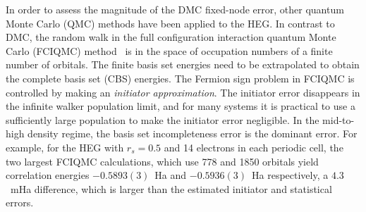 \documentclass[%
reprint,
 superscriptaddress,
 amsmath,amssymb,
 aps,
]{revtex4-1}
\begin{document}


In order to assess the magnitude of the DMC fixed-node error, other quantum Monte Carlo (QMC) methods
have been applied to the HEG.
In contrast to DMC, the random walk in the full configuration interaction quantum Monte Carlo (FCIQMC)
method~\cite{BooThoAla-JCP-09,CleBooAla-JCP-10,SheBooAla-JCP-12,SheBooGruAla-PRB-12} is in the space of
occupation numbers of a finite number of orbitals.
The finite basis set energies need to be extrapolated to obtain the complete basis set (CBS) energies.
The Fermion sign problem in FCIQMC is controlled by making an {\it initiator approximation}.
The initiator error disappears in the infinite walker population limit, and for many systems it is practical
to use a sufficiently large population to make the initiator error negligible.
In the mid-to-high density regime, the basis set incompleteness error is the dominant error.
For example, for the HEG with $r_s=0.5$ and 14 electrons in each periodic cell, the two largest FCIQMC
calculations, which use 778 and 1850 orbitals yield correlation energies $-0.5893(3)$~Ha and $-0.5936(3)$~Ha
respectively, a $4.3$~mHa difference, which is larger than the estimated initiator and statistical errors.
\end{document}
